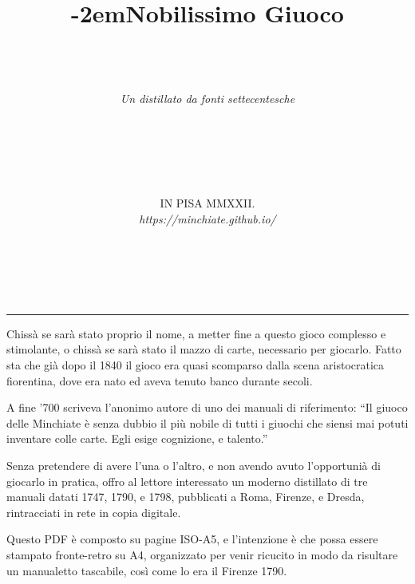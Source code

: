 \documentclass[11pt,a6paper]{article}
\title{\kern -2em\fontshape{sc}\LARGE Nobilissimo Giuoco\\ \normalsize \textls[1000]{delle}\\ \fontsize{34}{34}\selectfont{\textls[100]{MINCHIATE}}}
\author{%
  \vspace{-26pt}\\
\textit{Un distillato da fonti settecentesche}\\
\vspace{14pt}\\
\fontshape{sc}\fontsize{10}{34}\selectfont{\textls[350]{termini, regole}}\\
\vspace{24pt}\\
\fontshape{sc}\fontsize{10}{34}\selectfont{\textls[30]{e la giusta dose di}}\\
\fontshape{sc}\fontsize{18}{34}\selectfont{\textls[300]{poesia}}\\
\fontshape{sc}\fontsize{10}{34}\selectfont{\textls[90]{dell'epoca}}}
\date{%
  \vfill\small IN PISA MMXXII.\\ \sepline
  \textit{https:/\negthinspace/minchiate.github.io/}}
\newcommand{\supersection}[1]{%
\clearpage
    {\scshape \centering \huge #1\\}
    \vspace{6pt}
    \hrule
    \vspace{12pt}
}
\begin{document}
\renewcommand{\refname}{X\hfill{\large\mdseries\slshape Bibliografia}}


\maketitle

\supersection{\\ \textls[320]{Minchiate}}

\noindent Chissà se sarà stato proprio il nome, a metter fine a questo gioco complesso
e stimolante, o chissà se sarà stato il mazzo di carte, necessario per
giocarlo.  Fatto sta che già dopo il 1840 il gioco era quasi scomparso dalla
scena aristocratica fiorentina, dove era nato ed aveva tenuto banco durante
secoli.

A fine '700 scriveva l'anonimo autore di uno dei manuali di riferimento:
``Il giuoco delle Minchiate è senza dubbio il più nobile di tutti i giuochi
che siensi mai potuti inventare colle carte.  Egli esige cognizione, e
talento.''

Senza pretendere di avere l'una o l'altro, e non avendo avuto l'opportunià
di giocarlo in pratica, offro al lettore interessato un moderno distillato
di tre manuali datati 1747, 1790, e 1798, pubblicati a Roma, Firenze, e
Dresda, rintracciati in rete in copia digitale.

Questo PDF è composto su pagine ISO-A5, e l'intenzione è che possa
essere stampato fronte-retro su A4,  organizzato per venir ricucito in
modo da risultare un manualetto tascabile, così come lo era il Firenze 1790.
\end{document}
